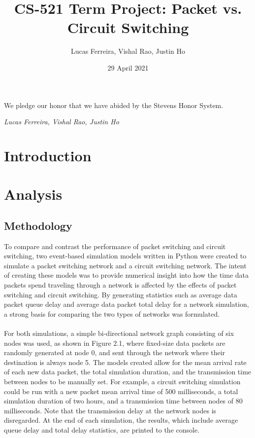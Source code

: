 \documentclass{article}
\title{CS-521 Term Project: Packet vs. Circuit Switching}
\author{Lucas Ferreira, Vishal Rao, Justin Ho}
\date{29 April 2021}
\begin{document}
  \maketitle

  {\flushleft We pledge our honor that we have abided by the Stevens Honor System.

  \textit{Lucas Ferreira, Vishal Rao, Justin Ho}}

  \section{Introduction}



  \section{Analysis}

  \subsection{Methodology}

  To compare and contrast the performance of packet switching and circuit switching, two event-based simulation models
  written in Python were created to simulate a packet switching network and a circuit switching network. The intent of
  creating these models was to provide numerical insight into how the time data packets spend traveling through a network
  is affected by the effects of packet switching and circuit switching. By generating statistics such as average data packet
  queue delay and average data packet total delay for a network simulation, a strong basis for comparing the two types of
  networks was formulated.\\\\
  For both simulations, a simple bi-directional network graph consisting of six nodes was used, as shown in Figure 2.1, where fixed-size data packets
  are randomly generated at node 0, and sent through the network where their destination is always node 5. The models
  created allow for the mean arrival rate of each new data packet, the total simulation duration, and the transmission time
  between nodes to be manually set. For example, a circuit switching simulation could be run with a new packet mean arrival time of 500 milliseconds, a
  total simulation duration of two hours, and a transmission time between nodes of 80 milliseconds. Note that the transmission delay
  at the network nodes is disregarded. At the end of each simulation, the results, which include average queue delay and total delay statistics, are printed to the console.
\end{document}
